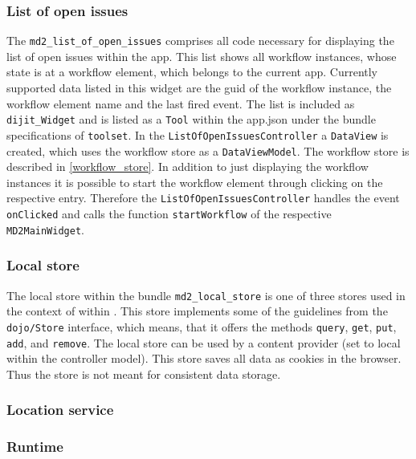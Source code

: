 \subsubsection{List of open issues}
\label{sec:listOfOpenIssues}

The \lstinline!md2_list_of_open_issues! comprises all code necessary for displaying the list of open issues within the app. This list shows all workflow instances, whose state is at a workflow element, which belongs to the current app. Currently supported data listed in this widget are the guid of the workflow instance, the workflow element name and the last fired event. 
The list is included as \lstinline!dijit_Widget! and is listed as a \texttt{Tool} within the app.json under the bundle specifications of \lstinline!toolset!. In the \lstinline!ListOfOpenIssuesController! a \lstinline!DataView! is created, which uses the workflow store as a \lstinline!DataViewModel!. The workflow store is described in \cref{workflow_store}.
In addition to just displaying the workflow instances it is possible to start the workflow element through clicking on the respective entry. Therefore the \lstinline!ListOfOpenIssuesController! handles the event \lstinline!onClicked! and calls the function \lstinline!startWorkflow! of the respective \lstinline!MD2MainWidget!.

\subsubsection{Local store} \label{local_store}



The local store within the bundle \lstinline|md2_local_store| is one of three stores used in the context of \mapapps within \MD. This store implements some of the guidelines from the \lstinline|dojo/Store| interface, which means, that it offers the methods \lstinline|query|, \lstinline|get|, \lstinline|put|, \lstinline|add|, and \lstinline|remove|.
The local store can be used by a content provider (set to local within the controller model). This store saves all data as cookies in the browser. Thus the store is not meant for consistent data storage.

\subsubsection{Location service}

\subsubsection{Runtime}

